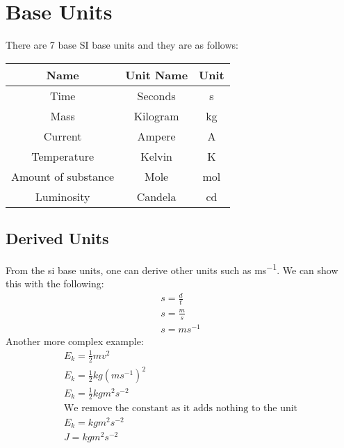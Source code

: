 \documentclass{article}
\begin{document}
\section{Base Units}
There are 7 base SI base units and they are as follows:

\begin{center}
  \begin{tabular}{ | c | c | c | }
    \hline
    Name & Unit Name & Unit \\ \hline
    Time & Seconds & \si{s} \\ \hline
    Mass & Kilogram & \si{kg} \\ \hline
    Current & Ampere & \si{A} \\ \hline
    Temperature & Kelvin & \si{K} \\ \hline
    Amount of substance & Mole & \si{mol} \\ \hline
    Luminosity & Candela & \si{cd} \\
    \hline
  \end{tabular}
\end{center}

\subsection{Derived Units}
From the si base units, one can derive other units such as \si{ms^{-1}}.
We can show this with the following:
\begin{gather*}
	s = \frac{d}{t} \\
	s = \frac{\si{m}}{\si{s}} \\
	s = \si{ms^{-1}}
\end{gather*}
Another more complex example: 
\begin{gather*}
	E_k = \frac{1}{2}mv^2 \\
	E_k = \frac{1}{2}\si{kg} \left (\si{ms^{-1}} \right )^2 \\
	E_k = \frac{1}{2}\si{kgm^{2}s^{-2}} \\
	\text{We remove the constant as it adds nothing to the unit} \\
	E_k = \si{kgm^{2}s^{-2}} \\
	J = \si{kgm^{2}s^{-2}} \\
\end{gather*}
\end{document}
